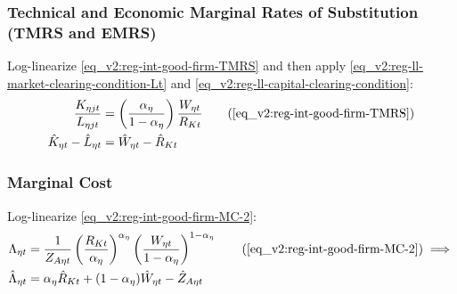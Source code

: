 \documentclass[../thesis.tex]{subfiles}
\begin{document}
\begin{comment}
	Subtract \ref{eq_v2:reg-ll-int-good-firm-FOC-Lt} from \ref{eq_v2:reg-ll-int-good-firm-FOC-Kt}:
	\begin{align}
		\hat{K}_{\eta t} - \hat{L}_{\eta t} &= \hat{Y}_{\eta t} + \hat{\Lambda}_{\eta t} - \hat{R}_{K t} - (\hat{Y}_{\eta t} + \hat{\Lambda}_{\eta t} - \hat{W}_{\eta t}) \implies \nonumber \\
		\hat{K}_{\eta t} - \hat{L}_{\eta t} &= \hat{W}_{\eta t} - \hat{R}_{K t} \label{eq_v2:reg-ll-int-good-firm-TMRS}
	\end{align}
	
	Equation \ref{eq_v2:reg-ll-int-good-firm-TMRS} is the log-linearized version of \ref{eq_v2:reg-int-good-firm-TMRS}.
	
\end{comment}

\subsubsection*{Technical and Economic Marginal Rates of Substitution (TMRS and EMRS)}

	Log-linearize \ref{eq_v2:reg-int-good-firm-TMRS} and then apply \ref{eq_v2:reg-ll-market-clearing-condition-Lt} and \ref{eq_v2:reg-ll-capital-clearing-condition}:
	\begin{align}
		\frac{K_{\eta jt}}{L_{\eta jt}} &= \left( \frac{{\alpha_{\eta}}}{1-\alpha_{\eta}} \right) \frac{W_{\eta t}}{R_{Kt}} \tag{\ref{eq_v2:reg-int-good-firm-TMRS}} \\
		\hat{K}_{\eta t} - \hat{L}_{\eta t} &= \hat{W}_{\eta t} - \hat{R}_{K t} \label{eq_v2:reg-ll-int-good-firm-TMRS}
	\end{align}

\subsubsection*{Marginal Cost}

Log-linearize \ref{eq_v2:reg-int-good-firm-MC-2}:
\begin{align}
	\Lambda_{\eta t} &= \frac{1}{Z_{A\eta t}} \left( \frac{R_{Kt}}{{\alpha_{\eta}}} \right)^{{\alpha_{\eta}}} \left( \frac{W_{\eta t}}{1-\alpha_{\eta}} \right)^{1-\alpha_{\eta}} \tag{\ref{eq_v2:reg-int-good-firm-MC-2}} \implies \\
	\hat{\Lambda}_{\eta t} &= {\alpha_{\eta}} \hat{R}_{Kt} + (1- {\alpha_{\eta}}) \hat{W}_{\eta t} - \hat{Z}_{A\eta t} \label{eq_v2:reg-ll-int-good-firm-MC-2}
\end{align}
\end{document}
